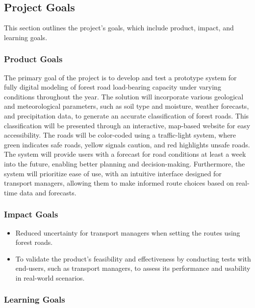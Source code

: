 

\subsection{Project Goals}
This section outlines the project's goals, which include product, impact, and learning goals.
\subsubsection{Product Goals}
The primary goal of the project is to develop and test a prototype system for fully digital modeling of forest road load-bearing capacity under varying conditions throughout the year. The solution will incorporate various geological and meteorological parameters, such as soil type and moisture, weather forecasts, and precipitation data, to generate an accurate classification of forest roads. This classification will be presented through an interactive, map-based website for easy accessibility. The roads will be color-coded using a traffic-light system, where green indicates safe roads, yellow signals caution, and red highlights unsafe roads. The system will provide users with a forecast for road conditions at least a week into the future, enabling better planning and decision-making. Furthermore, the system will prioritize ease of use, with an intuitive interface designed for transport managers, allowing them to make informed route choices based on real-time data and forecasts. 

\subsubsection{Impact Goals}
\begin{itemize}
    \item Reduced uncertainty for transport managers when setting the routes using forest roads.
    \item To validate the product's feasibility and effectiveness by conducting tests with end-users, such as transport managers, to assess its performance and usability in real-world scenarios.

\end{itemize}

\subsubsection{Learning Goals}

